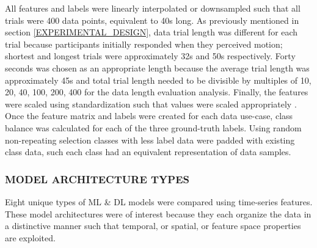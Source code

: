\documentclass{ieeeaccess}
\begin{document}
All features and labels were linearly interpolated or downsampled such that all trials were 400 data points, equivalent to 40s long. As previously mentioned in section \ref{EXPERIMENTAL_DESIGN}, data trial length was different for each trial because participants initially responded when they perceived motion; shortest and longest trials were approximately 32s and 50s respectively. Forty seconds was chosen as an appropriate length because the average trial length was approximately 45s and total trial length needed to be divisible by multiples of 10, 20, 40, 100, 200, 400 for the data length evaluation analysis. Finally, the features were scaled using standardization such that values were scaled appropriately \cite{Burkov_2019_ML}. Once the feature matrix and labels were created for each data use-case, class balance was calculated for each of the three ground-truth labels. Using random non-repeating selection classes with less label data were padded with existing class data, such each class had an equivalent representation of data samples.


\subsubsection{MODEL ARCHITECTURE TYPES}
Eight unique types of ML \& DL models were compared using time-series features. These model architectures were of interest because they each organize the data in a distinctive manner such that temporal, or spatial, or feature space properties are exploited.\\
\end{document}
